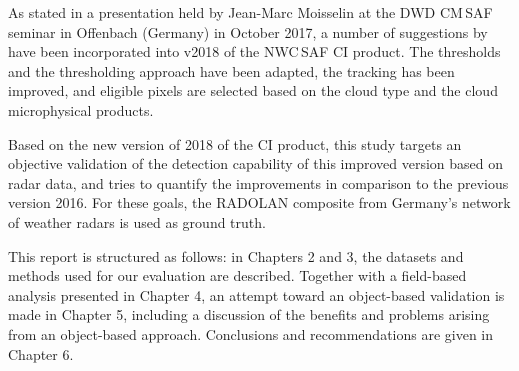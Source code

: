 As stated in a presentation held by Jean-Marc Moisselin \citep{Mousselin2017} at the DWD CM\,SAF seminar in Offenbach (Germany) in October 2017, a number of suggestions by \citet{Karagiannidis2016} have been incorporated into v2018 of the NWC\,SAF CI product. The thresholds and the thresholding approach have been adapted, the tracking has been improved, and eligible pixels are selected based on the cloud type and the cloud microphysical products. 

Based on the new version of 2018 of the CI product, this study targets an objective validation of  the detection capability of this improved version based on radar data, and tries to quantify the improvements in comparison to the previous version 2016. For these goals, the RADOLAN composite from Germany's network of weather radars is used as ground truth.

This report is structured as follows: in Chapters 2 and 3, the datasets and methods used for our evaluation are described. Together with a field-based analysis presented in Chapter 4, an attempt toward an object-based validation is made in Chapter 5, including a discussion of the benefits and problems arising from an object-based approach. Conclusions and recommendations are given in Chapter 6.


